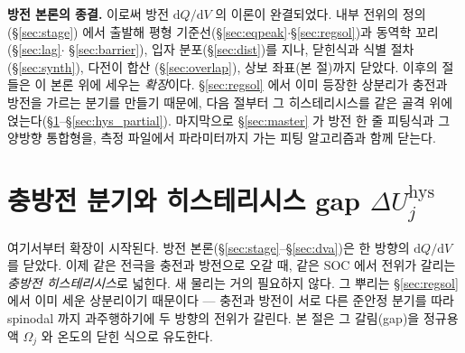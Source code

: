 \documentclass[11pt,a4paper]{article}
\newcommand{\dd}{\mathrm{d}}
\newcommand{\hys}{\mathrm{hys}}
\begin{document}
\medskip
\textbf{방전 본론의 종결.} 이로써 방전 $\dd Q/\dd V$ 의 이론이 완결되었다. 내부 전위의 정의(\S\ref{sec:stage})
에서 출발해 평형 기준선(\S\ref{sec:eqpeak}$\cdot$\S\ref{sec:regsol})과 동역학 꼬리(\S\ref{sec:lag}$\cdot$
\S\ref{sec:barrier}), 입자 분포(\S\ref{sec:dist})를 지나, 닫힌식과 식별 절차(\S\ref{sec:synth}), 다전이 합산
(\S\ref{sec:overlap}), 상보 좌표(본 절)까지 닫았다. 이후의 절들은 이 본론 위에 세우는 \emph{확장}이다.
\S\ref{sec:regsol} 에서 이미 등장한 상분리가 충전과 방전을 가르는 분기를 만들기 때문에, 다음 절부터 그
히스테리시스를 같은 골격 위에 얹는다(\S\ref{sec:hys_branch}--\S\ref{sec:hys_partial}). 마지막으로
\S\ref{sec:master} 가 방전 한 줄 피팅식과 그 양방향 통합형을, 측정 파일에서 파라미터까지 가는 피팅 알고리즘과
함께 닫는다.

\section{충방전 분기와 히스테리시스 gap $\Delta U_j^\hys$}\label{sec:hys_branch}
여기서부터 확장이 시작된다. 방전 본론(\S\ref{sec:stage}--\S\ref{sec:dva})은 한 방향의 $\dd Q/\dd V$ 를
닫았다. 이제 같은 전극을 충전과 방전으로 오갈 때, 같은 SOC 에서 전위가 갈리는 \emph{충방전 히스테리시스}로
넓힌다. 새 물리는 거의 필요하지 않다. 그 뿌리는 \S\ref{sec:regsol} 에서 이미 세운 상분리이기 때문이다 —
충전과 방전이 서로 다른 준안정 분기를 따라 spinodal 까지 과주행하기에 두 방향의 전위가 갈린다. 본 절은 그
갈림(gap)을 정규용액 $\Omega_j$ 와 온도의 닫힌 식으로 유도한다.
\end{document}
